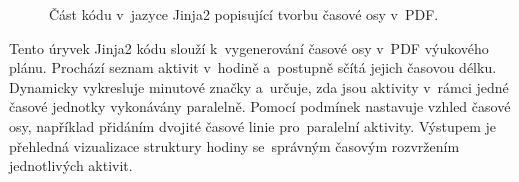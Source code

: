 \documentclass[male,czech,api_bc]{kitheses}
\begin{document}
\begin{figure}[H]
	\centering
	\caption{Část kódu v~jazyce Jinja2 popisující tvorbu časové osy v~PDF.}
	\label{fig:code-3}
\end{figure}

Tento úryvek Jinja2 kódu slouží k~vygenerování časové osy v~PDF výukového plánu. Prochází seznam aktivit v~hodině a~postupně sčítá jejich časovou délku. Dynamicky vykresluje minutové značky a~určuje, zda jsou aktivity v~rámci jedné časové jednotky vykonávány paralelně. Pomocí podmínek nastavuje vzhled časové osy, například přidáním dvojité časové linie pro~paralelní aktivity. Výstupem je přehledná vizualizace struktury hodiny se~správným časovým rozvržením jednotlivých aktivit.
\end{document}
